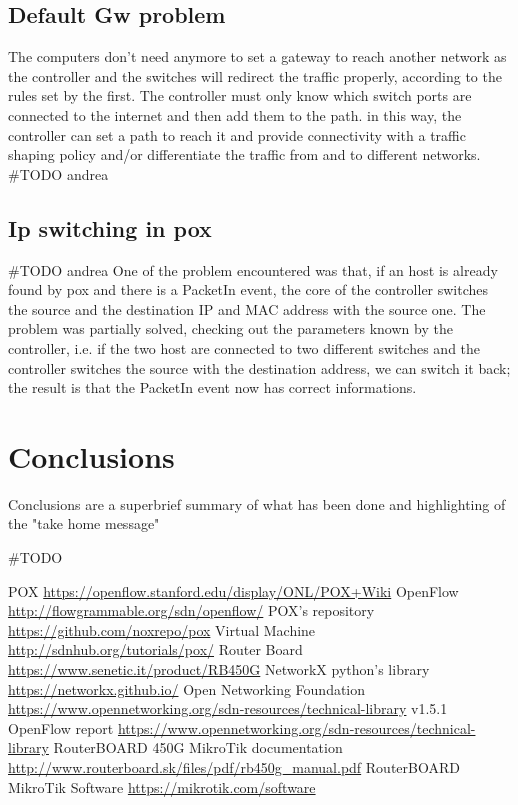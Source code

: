 \documentclass[conference,10pt]{IEEEtran}
\begin{document}
  \subsection{Default Gw problem}
  The computers don't need anymore to set a gateway to reach another network as the controller and the switches will redirect the traffic
  properly, according to the rules set by the first. The controller must only know which switch ports are connected to the
  internet and then add them to the path. in this way, the controller can set a path to reach it and provide connectivity with
  a traffic shaping policy and/or differentiate the traffic from and to different networks.
  \#TODO andrea

  \subsection{Ip switching in pox}
  \#TODO andrea
	One of the problem encountered was that, if an host is already found by pox and there is a PacketIn event, the core of the controller
	switches the source and the destination IP and MAC address with the source one. The problem was partially solved, checking out the
	parameters known by the controller, i.e. if the two host are connected to two different switches and the controller switches the source with the
	destination address, we can switch it back; the result is that the PacketIn event now has correct informations.

\section{Conclusions}\label{sec:conclusion}
Conclusions are a superbrief summary of what has been done and highlighting of the "take home message"

\#TODO


\begin{thebibliography}{99}
	 POX \url{https://openflow.stanford.edu/display/ONL/POX+Wiki}
	 OpenFlow \url{http://flowgrammable.org/sdn/openflow/}
	 POX's repository \url{https://github.com/noxrepo/pox}
	 Virtual Machine \url{http://sdnhub.org/tutorials/pox/}
	 Router Board \url{https://www.senetic.it/product/RB450G}
	 NetworkX python's library \url{https://networkx.github.io/}
	 Open Networking Foundation \url{https://www.opennetworking.org/sdn-resources/technical-library}
	 v1.5.1 OpenFlow report \url{https://www.opennetworking.org/sdn-resources/technical-library}
	 RouterBOARD 450G MikroTik documentation \url{http://www.routerboard.sk/files/pdf/rb450g_manual.pdf}
	 RouterBOARD MikroTik Software \url{https://mikrotik.com/software}
\end{thebibliography}
\end{document}
